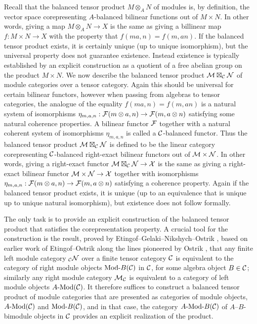 \documentclass{amsart}
\begin{document}
Recall that the balanced tensor product $M \otimes_A N$ of modules is, by definition, the vector space corepresenting $A$-balanced bilinear functions out of $M \times N$.  In other words, giving a map $M \otimes_A N \rightarrow X$ is the same as giving a billinear map $f: M \times N \rightarrow X$ with the property that $f(ma,n) = f(m, an)$.  If the balanced tensor product exists, it is certainly unique (up to unique isomorphism), but the universal property does not guarantee existence.  Instead existence is typically established by an explicit construction as a quotient of a free abelian group on the product $M \times N$. We now describe the balanced tensor product $\mathcal M \boxtimes_{\mathcal C} \mathcal N$ of module categories over a tensor category.  Again this should be universal for certain bilinear functors, however when passing from algebras to tensor categories, the analogue of the equality $f(ma,n) = f(m, an)$ is a natural system of isomorphisms $\eta_{m,a,n}: \mathcal F(m \otimes a,n) \rightarrow \mathcal F(m, a \otimes n)$ satisfying some natural coherence properties.  A bilinear functor $\mathcal F$ together with a natural coherent system of isomorphisms $\eta_{m,a,n}$ is called a $\mathcal C$-balanced functor.  Thus the balanced tensor product $\mathcal M \boxtimes_{\mathcal C} \mathcal N$ is defined to be the linear category corepresenting $\mathcal C$-balanced right-exact bilinear functors out of $\mathcal M \times \mathcal N$. In other words, giving a right-exact functor $\mathcal M \boxtimes_{\mathcal C} \mathcal N \rightarrow \mathcal X$ is the same as giving a right-exact bilinear functor $\mathcal M \times \mathcal N \rightarrow \mathcal X$ together with isomorphisms $\eta_{m,a,n}: \mathcal F(m \otimes a,n) \rightarrow \mathcal F(m, a \otimes n)$ satisfying a coherence property.  Again if the balanced tensor product exists, it is unique (up to an equivalence that is unique up to unique natural isomorphism), but existence does not follow formally. 

The only task is to provide an explicit construction of the balanced tensor product that satisfies the corepresentation property.  A crucial tool for the construction is the result, proved by Etingof--Gelaki--Nikshych--Ostrik \cite[Thm 2.11.6]{EGNO}, based on earlier work of Etingof--Ostrik \cite[\S 3.2]{EO-ftc} along the lines pioneered by Ostrik \cite[Thm 1]{MR1976459}, that any finite left module category ${}_{\mathcal C} \mathcal N$ over a finite tensor category $\mathcal C$ is equivalent to the category of right module objects $\Mod{}{B}(\cC)$ in $\mathcal C$, for some algebra object $B \in \mathcal C$; similarly any right module category $\mathcal M_{\mathcal C}$ is equivalent to a category of left module objects $\Mod{A}{}(\cC)$.  It therefore suffices to construct a balanced tensor product of module categories that are presented as categories of module objects, $\Mod{A}{}(\cC)$ and $\Mod{}{B}(\cC)$, and in that case, the category $\Mod{A}{B}(\cC)$ of $A$--$B$-bimodule objects in $\mathcal C$ provides an explicit realization of the product.
\end{document}
